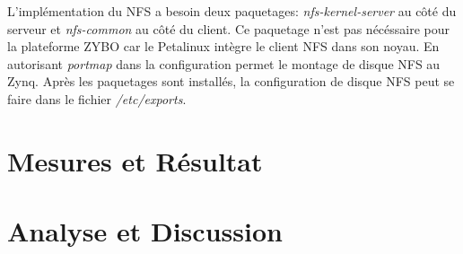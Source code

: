 L'implémentation du NFS a besoin deux paquetages: \emph{nfs-kernel-server} au côté du serveur et \emph{nfs-common} au côté du client.
Ce paquetage n'est pas nécéssaire pour la plateforme ZYBO car le Petalinux intègre le client NFS dans son noyau.
En autorisant \emph{portmap} dans la configuration permet le montage de disque NFS au Zynq. Après les paquetages sont installés,
la configuration de disque NFS peut se faire dans le fichier \emph{/etc/exports}.

\section{Mesures et Résultat}


\blindtext

\section{Analyse et Discussion}

\blindtext